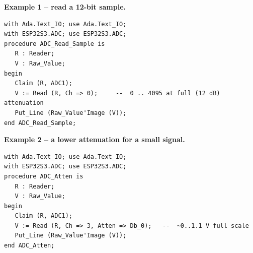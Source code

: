 \textbf{Example 1 -- read a 12-bit sample.}
\begin{lstlisting}
with Ada.Text_IO; use Ada.Text_IO;
with ESP32S3.ADC; use ESP32S3.ADC;
procedure ADC_Read_Sample is
   R : Reader;
   V : Raw_Value;
begin
   Claim (R, ADC1);
   V := Read (R, Ch => 0);     --  0 .. 4095 at full (12 dB) attenuation
   Put_Line (Raw_Value'Image (V));
end ADC_Read_Sample;
\end{lstlisting}

\textbf{Example 2 -- a lower attenuation for a small signal.}
\begin{lstlisting}
with Ada.Text_IO; use Ada.Text_IO;
with ESP32S3.ADC; use ESP32S3.ADC;
procedure ADC_Atten is
   R : Reader;
   V : Raw_Value;
begin
   Claim (R, ADC1);
   V := Read (R, Ch => 3, Atten => Db_0);   --  ~0..1.1 V full scale
   Put_Line (Raw_Value'Image (V));
end ADC_Atten;
\end{lstlisting}
